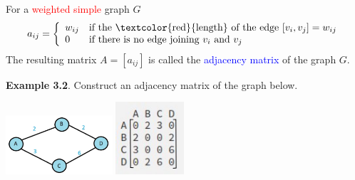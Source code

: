 \documentclass[aspectratio=169]{beamer}
\providecommand{\Blue}[1]{\textcolor{blue}{#1}}
\providecommand{\Red}[1]{\textcolor{red}{#1}}
\begin{document}
\begin{frame}[plain]{ }

For a \Red{weighted simple} graph $G$
 \[ 
   a_{ij} = \left\{ \begin{array}{ll}
       w_{ij} & \mbox{if}\ \mbox{the\ \Red{length}\ of\ the\ edge}\ [v_i, v_j]
         = w_{ij}\\
       0 & \mbox{if there is no edge joining}\ v_i\ \mbox{and}\ v_j
       \end{array}
       \right.
\]  
The resulting matrix $A=[a_{ij}]$ is called the \Blue{adjacency matrix} of the graph $G$.
\medskip

\pause

{\bf Example 3.2}. Construct an adjacency matrix of the graph below.
\medskip

 \begin{center}
  \includegraphics[height=2.2cm]{./img/lecture3-fig3.png}\hspace{.5in}\pause
   \includegraphics[height=2.7cm]{./img/lecture3-fig3b-1.jpg}
 \end{center}
 

\end{frame}
\end{document}
